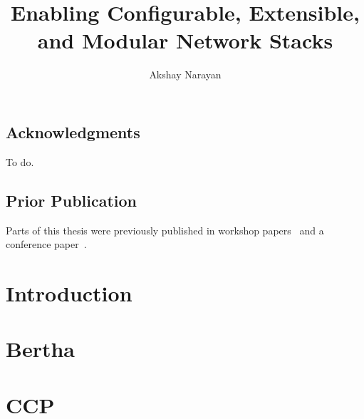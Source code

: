 \documentclass[fontsize=12pt,paper=letter,twosided,cleardoublepage=plain,final]{scrbook}
\title{Enabling Configurable, Extensible, and Modular Network Stacks}
\author{Akshay Narayan}
\begin{document}
\frontmatter



\cleardoublepage


\cleardoublepage

\section*{Acknowledgments}
\begin{spacing}{1}
%
    To do.
\end{spacing}
\cleardoublepage

\section*{Prior Publication}
Parts of this thesis were previously published in workshop papers~\cite{ccp, bertha} and a conference
paper~\cite{ccp}.
\cleardoublepage

\tableofcontents

\mainmatter

\chapter{Introduction}\label{s:intro}



\chapter{Bertha}\label{s:bertha}


\afterpage{\FloatBarrier}
\afterpage{\clearpage}

\afterpage{\FloatBarrier}
\afterpage{\clearpage}

\afterpage{\FloatBarrier}
\afterpage{\clearpage}

\afterpage{\FloatBarrier}
\afterpage{\clearpage}

\afterpage{\FloatBarrier}
\afterpage{\clearpage}

\afterpage{\FloatBarrier}
\afterpage{\clearpage}

\chapter{CCP}\label{s:ccp}


\afterpage{\FloatBarrier}
\afterpage{\clearpage}

\afterpage{\FloatBarrier}
\afterpage{\clearpage}

\afterpage{\FloatBarrier}
\afterpage{\clearpage}

\afterpage{\FloatBarrier}
\afterpage{\clearpage}

\afterpage{\FloatBarrier}
\afterpage{\clearpage}

\afterpage{\FloatBarrier}
\afterpage{\clearpage}

\afterpage{\FloatBarrier}
\afterpage{\clearpage}

\end{document}
